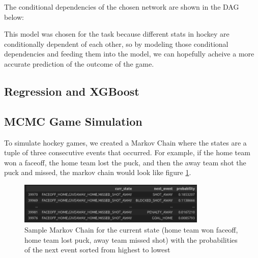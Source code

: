 \documentclass[11pt]{article}
\begin{document}
The conditional dependencies of the chosen network are shown in the DAG below:

\begin{center}
\end{center}

This model was chosen for the task because different stats in hockey are conditionally dependent of each other, so by modeling those conditional
dependencies and feeding them into the model, we can hopefully acheive a more accurate prediction of the outcome of the game.

\subsection{Regression and XGBoost}

\subsection{MCMC Game Simulation}

To simulate hockey games, we created a Markov Chain where the states are a tuple of three consecutive
events that occurred. For example, if the home team won a faceoff, the home team lost the puck, and 
then the away team shot the puck and missed, the markov chain would look like figure \ref{fig:markov_chain_sample}.

\begin{figure}[H]
    \centering
    \includegraphics[width=0.8\textwidth]{images/markov_chain_sample.png}
    \caption{Sample Markov Chain for the current state (home team won faceoff, 
    home team lost puck, away team missed shot) with the probabilities of the next event 
    sorted from highest to lowest}
    \label{fig:markov_chain_sample}
\end{figure}
\end{document}
